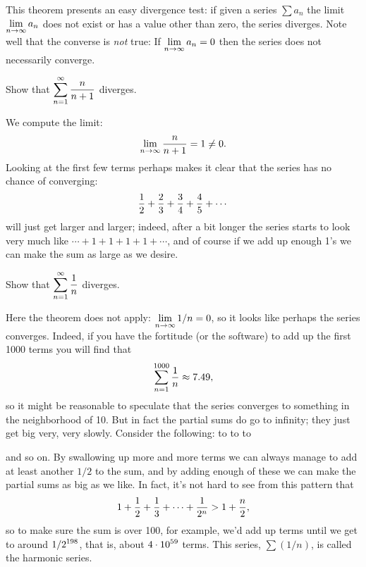 This theorem presents an easy divergence 
test: if given a series $\sum
a_n$ the limit $\displaystyle\lim_{n\to\infty}a_n$ does not exist or has a value
other than zero, the series diverges. Note well that the converse is
{\em not\/} true: If $\displaystyle\lim_{n\to\infty}a_n=0$ then the series does
not necessarily converge.

\begin{example}
Show that $\displaystyle\sum_{n=1}^\infty {n\over n+1}$ diverges.
\par\nobreak\ssk\noindent
We compute the limit:
$$\lim _{n\to\infty}{n\over n+1}=1\not=0.$$
Looking at the first few terms perhaps makes it clear that the series
has no chance of converging:
$${1\over2}+{2\over3}+{3\over4}+{4\over5}+\cdots$$
will just get larger and larger; indeed, after a bit longer the series
starts to look very much like $\cdots+1+1+1+1+\cdots$, and of course
if we add up enough 1's we can make the sum as large as we desire.
\end{example}

\begin{example}
Show that $\displaystyle\sum_{n=1}^\infty {1\over n}$ diverges.
\par\nobreak\ssk\noindent
Here the theorem does not apply: $\displaystyle\lim _{n\to\infty} 1/n=0$, so it
looks like perhaps the series converges. Indeed, if you have the
fortitude (or the software) to add up the first 1000 terms you will find that
$$\sum_{n=1}^{1000} {1\over n}\approx 7.49,$$
so it might be reasonable to speculate that the series converges to
something in the neighborhood of 10. But in fact the partial sums do go
to infinity; they just get big very, very slowly. Consider the
following:
\msk
\hbox to 
\msk
\hbox to 
\msk
\hbox to 

\msk\noindent
and so on. By swallowing up more and more terms we can always manage
to add at least another $1/2$ to the sum, and by adding enough of
these we can make the partial sums as big as we like. In fact, it's
not hard to see from this pattern that
$$1+{1\over 2}+{1\over 3}+\cdots+{1\over 2^n} > 1+{n\over 2},$$
so to make sure the sum is over 100, for example, we'd add
up terms until we get to around $\displaystyle 1/2^{198}$, that is,
about $\displaystyle 4\cdot 10^{59}$ terms. This series, $\sum (1/n)$, is called the
{\dfont harmonic series\/}.
\end{example}

